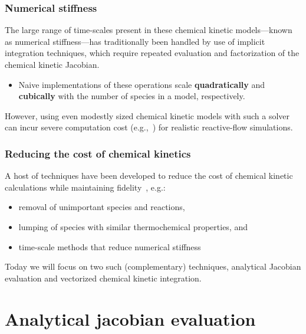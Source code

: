 \documentclass{beamer}
\newenvironment{background}{%
\usebackgroundtemplate{%
\rule{0pt}{\paperheight}%
\hspace*{\paperwidth}%
\makebox[0pt][r]{\texttt{[image: logo]}}%
}}{}
\begin{document}
\begin{frame}
 \frametitle{Numerical stiffness}
 The large range of time-scales present in these chemical kinetic models---known as numerical stiffness---has traditionally been handled by use of implicit integration techniques, which require repeated evaluation and factorization of the chemical kinetic Jacobian.
 \begin{itemize}
  \item Naive implementations of these operations scale \textbf{quadratically} and \textbf{cubically} with the number of species in a model, respectively.
 \end{itemize}
 However, using even modestly sized chemical kinetic models with such a solver can incur severe computation cost (e.g.,~) for realistic reactive-flow simulations.
\end{frame}


\begin{frame}
 \frametitle{Reducing the cost of chemical kinetics}
  A host of techniques have been developed to reduce the cost of chemical kinetic calculations while maintaining fidelity~, e.g.:
  \begin{itemize}
   \item removal of unimportant species and reactions,
   \item lumping of species with similar thermochemical properties, and
   \item time-scale methods that reduce numerical stiffness
  \end{itemize}
  Today we will focus on two such (complementary) techniques, analytical Jacobian evaluation and vectorized chemical kinetic integration.
\end{frame}

\begin{background}
\section{Analytical jacobian evaluation}
\end{background}

\begin{frame}
\end{frame}
\end{document}
